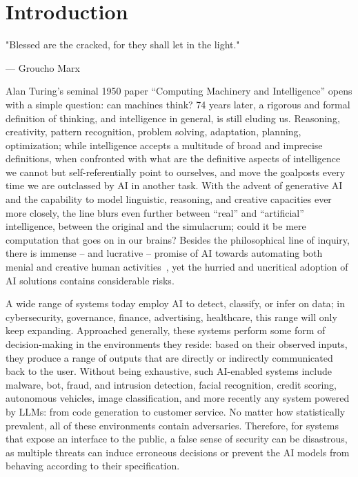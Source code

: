 \chapter{Introduction}\label{ch:introduction}

\epigraph{"Blessed are the cracked, for they shall let in the light."}{--- Groucho Marx}


Alan Turing's seminal 1950 paper ``Computing Machinery and Intelligence'' opens with a simple question: can machines think?
74 years later, a rigorous and formal definition of thinking, and intelligence in general, is still eluding us.
Reasoning, creativity, pattern recognition, problem solving, adaptation, planning, optimization; while intelligence accepts a multitude of broad and imprecise definitions, when confronted with what are the definitive aspects of intelligence we cannot but self-referentially point to ourselves, and move the goalposts every time we are outclassed by \gls{AI} in another task.
With the advent of generative \gls{AI} and the capability to model linguistic, reasoning, and creative capacities ever more closely, the line blurs even further between ``real'' and ``artificial'' intelligence, between the original and the simulacrum; could it be mere computation that goes on in our brains?
Besides the philosophical line of inquiry, there is immense -- and lucrative -- promise of \gls{AI} towards automating both menial and creative human activities~\cite{benjamin1935work}, yet the hurried and uncritical adoption of \gls{AI} solutions contains considerable risks.

A wide range of systems today employ \gls{AI} to detect, classify, or infer on data; in cybersecurity, governance, finance, advertising, healthcare, this range will only keep expanding.
Approached generally, these systems perform some form of decision-making in the environments they reside: based on their observed inputs, they produce a range of outputs that are directly or indirectly communicated back to the user.
Without being exhaustive, such AI-enabled systems include malware, bot, fraud, and intrusion detection, facial recognition, credit scoring, autonomous vehicles, image classification, and more recently any system powered by LLMs: from code generation to customer service.
No matter how statistically prevalent, all of these environments contain adversaries.
Therefore, for systems that expose an interface to the public, a false sense of security can be disastrous, as multiple threats can induce erroneous decisions or prevent the \gls{AI} models from behaving according to their specification.

